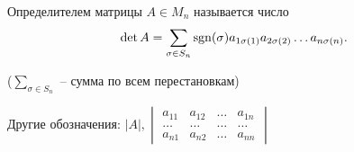 \begin{definition}
    Определителем матрицы $A \in M_n$ называется число
    \begin{equation*}
        \det A = \sum_{\sigma \in S_n} \operatorname{\mathop{\mathrm{sgn}}}(\sigma) a_{1\sigma(1)} a_{2 \sigma(2)} \dots a_{n\sigma(n)}
    .\end{equation*}

    ($\sum_{\sigma \in S_n}$ -- сумма по всем перестановкам)
\end{definition}

\bigskip
Другие обозначения: $|A|, \begin{vmatrix} a_{11} & a_{12} & \dots & a_{1n} \\ \dots & \dots & \dots & \dots \\ a_{n1} & a_{n2} & \dots & a_{nn} \end{vmatrix}$


